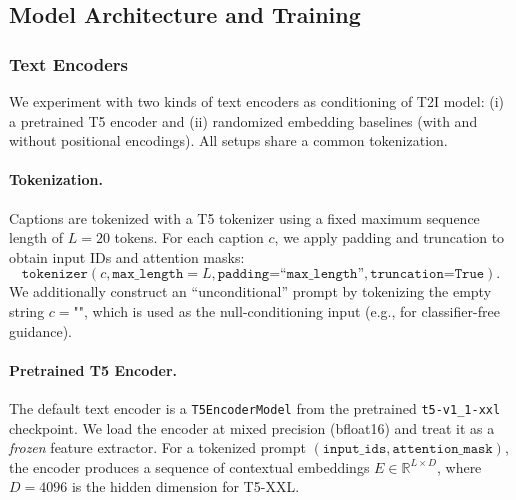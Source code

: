 \subsection{Model Architecture and Training}\label{method:model_arch}



\subsubsection{Text Encoders}
We experiment with two kinds of text encoders as conditioning of T2I model: (i) a pretrained T5 encoder and (ii) randomized embedding baselines (with and without positional encodings). 
All setups share a common tokenization.

\paragraph{Tokenization.}
Captions are tokenized with a T5 tokenizer using a fixed maximum sequence length of $L=20$ tokens. For each caption $c$, we apply padding and truncation to obtain input IDs and attention masks:
\[
\texttt{tokenizer}(c, \texttt{max\_length}=L, \texttt{padding=``max\_length''}, \texttt{truncation=True}).
\]
We additionally construct an \enquote{unconditional} prompt by tokenizing the empty string $c = \texttt{""}$, which is used as the null-conditioning input (e.g., for classifier-free guidance). %

\paragraph{Pretrained T5 Encoder.}
\begin{sloppypar}
The default text encoder is a \texttt{T5EncoderModel} from the pretrained \texttt{t5-v1\_1-xxl} checkpoint. We load the encoder at mixed precision (bfloat16) and treat it as a \textit{frozen} feature extractor. For a tokenized prompt $(\texttt{input\_ids}, \texttt{attention\_mask})$, the encoder produces a sequence of contextual embeddings
$E \in \mathbb{R}^{L \times D}$,
where $D=4096$ is the hidden dimension for T5-XXL. %
\end{sloppypar}

